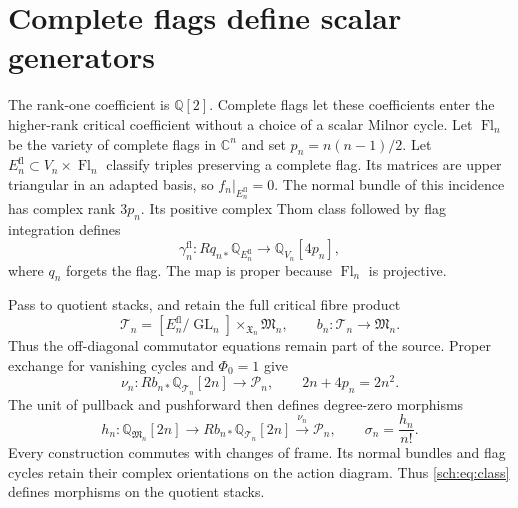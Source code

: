 \section{Complete flags define scalar generators}
\label{sch:sec:flags}

The rank-one coefficient is $\mathbb Q[2]$. Complete flags let these
coefficients enter the higher-rank critical coefficient without a choice
of a scalar Milnor cycle.
Let $\operatorname{Fl}_n$ be the variety of complete flags in
$\mathbb C^n$ and set $p_n=n(n-1)/2$.
Let $E_n^{\mathrm{fl}}\subset V_n\times\operatorname{Fl}_n$ classify
triples preserving a complete flag. Its matrices are upper triangular
in an adapted basis, so $f_n|_{E_n^{\mathrm{fl}}}=0$.
The normal bundle of this incidence has complex rank $3p_n$.
Its positive complex Thom class followed by flag integration defines
\[
 \gamma_n^{\mathrm{fl}}:
 Rq_{n*}\mathbb Q_{E_n^{\mathrm{fl}}}
       \longrightarrow\mathbb Q_{V_n}[4p_n],
\]
where $q_n$ forgets the flag. The map is proper because
$\operatorname{Fl}_n$ is projective.

Pass to quotient stacks, and retain the full critical fibre product
\[
 \mathcal T_n=[E_n^{\mathrm{fl}}/\operatorname{GL}_n]
                    \mathbin{\times}_{\mathfrak X_n}\mathfrak M_n,
 \qquad b_n:\mathcal T_n\longrightarrow\mathfrak M_n.
\]
Thus the off-diagonal commutator equations remain part of the source.
Proper exchange for vanishing cycles
\cite[\S3, p.~35]{schMasseyNotes} and $\Phi_0=1$ give
\[
 \nu_n:Rb_{n*}\mathbb Q_{\mathcal T_n}[2n]
       \longrightarrow\mathcal P_n,
 \qquad 2n+4p_n=2n^2.
\]
The unit of pullback and pushforward then defines degree-zero morphisms
\begin{equation}
 h_n:\mathbb Q_{\mathfrak M_n}[2n]
 \longrightarrow Rb_{n*}\mathbb Q_{\mathcal T_n}[2n]
 \xrightarrow{\nu_n}\mathcal P_n,
 \qquad \sigma_n=\frac{h_n}{n!}.
 \label{sch:eq:class}
\end{equation}
Every construction commutes with changes of frame. Its normal bundles
and flag cycles retain their complex orientations on the action diagram.
Thus \eqref{sch:eq:class} defines morphisms on the quotient stacks.

